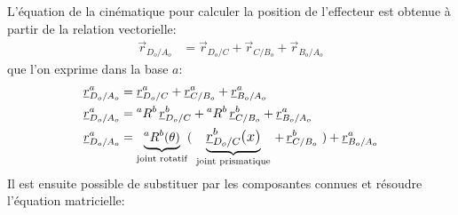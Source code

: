 L'équation de la cinématique pour calculer la position de l'effecteur est obtenue à partir de la relation vectorielle:
\begin{align}
	\vec{r}_{D_o/A_o}   &=  \vec{r}_{D_o/C} + \vec{r}_{C/B_o} + \vec{r}_{B_o/A_o}
\end{align}
que l'on exprime dans la base $a$:
\begin{align}
	\underline{r}_{D_o/A_o}^a &=  \underline{r}_{D_o/C}^a + \underline{r}_{C/B_o}^a + \underline{r}_{B_o/A_o}^a \\
	\underline{r}_{D_o/A_o}^a &=  {}^aR^b  \, \underline{r}_{D_o/C}^b + {}^aR^b \, \underline{r}_{C/B_o}^b + \underline{r}_{B_o/A_o}^a \\
	\underline{r}_{D_o/A_o}^a &=   \underbrace{{}^aR^b(\theta)}_{\text{joint rotatif}} \large( \, \, \underbrace{\underline{r}_{D_o/C}^b(x)}_{\text{joint prismatique}} \, + \, \underline{r}_{C/B_o}^b  \, \, \large) + \underline{r}_{B_o/A_o}^a
\end{align}
Il est ensuite possible de substituer par les composantes connues et résoudre l'équation matricielle:
